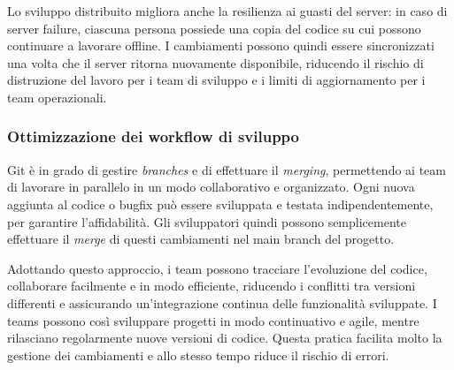 Lo sviluppo distribuito migliora anche la resilienza ai guasti del server: in caso di server failure, ciascuna persona possiede una copia del codice su cui possono continuare a lavorare offline. I cambiamenti possono quindi essere sincronizzati una volta che il server ritorna nuovamente disponibile, riducendo il rischio di distruzione del lavoro per i team di sviluppo e i limiti di aggiornamento per i team operazionali.

\subsubsection{Ottimizzazione dei workflow di sviluppo}
Git è in grado di gestire \textit{branches} e di effettuare il \textit{merging}, permettendo ai team di lavorare in parallelo in un modo collaborativo e organizzato. Ogni nuova aggiunta al codice o bugfix può essere sviluppata e testata indipendentemente, per garantire l'affidabilità. Gli sviluppatori quindi possono semplicemente effettuare il \textit{merge} di questi cambiamenti nel main branch del progetto.

Adottando questo approccio, i team possono tracciare l'evoluzione del codice, collaborare facilmente e in modo efficiente, riducendo i conflitti tra versioni differenti e assicurando un'integrazione continua delle funzionalità sviluppate. I teams possono così sviluppare progetti in modo continuativo e agile, mentre rilasciano regolarmente nuove versioni di codice. Questa pratica facilita molto la gestione dei cambiamenti e allo stesso tempo riduce il rischio di errori.

